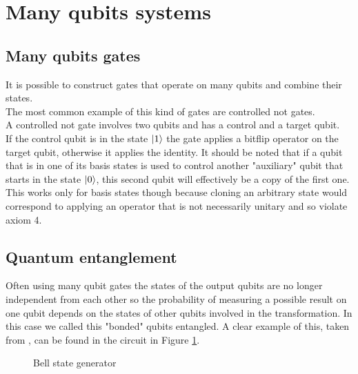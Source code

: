 \documentclass{article}
\begin{document}
\section{Many qubits systems}



\subsection{Many qubits gates}
It is possible to construct gates that operate on many qubits and combine their states.\\
The most common example of this kind of gates are controlled not gates.\\
A controlled not gate involves two qubits and has a control and a target qubit.\\
If the control qubit is in the state $\ket{1}$ the gate applies a bitflip
operator on the target qubit, otherwise it applies the identity.
It should be noted that if a qubit that is in one of its basis states
is used to control another "auxiliary" qubit that starts in the state
$\ket{0}$, this second qubit will effectively be a copy of the first one.
This works only for basis states though because cloning an arbitrary
state would correspond to applying an operator that is not necessarily
unitary and so violate axiom 4.



\subsection{Quantum entanglement}

Often using many qubit gates the states of the output qubits are no longer
independent from each other so the probability of measuring a possible result
on one qubit depends on the states of other qubits involved in the transformation.
In this case we called this "bonded" qubits entangled.
A clear example of this, taken from \cite{ekert_quantum_information_2020}, can be found in the circuit in Figure \ref{entanglement}.\\

\begin{figure}[H]
	\centering
	\caption{Bell state generator}
	\label{entanglement}
\end{figure}
\end{document}
